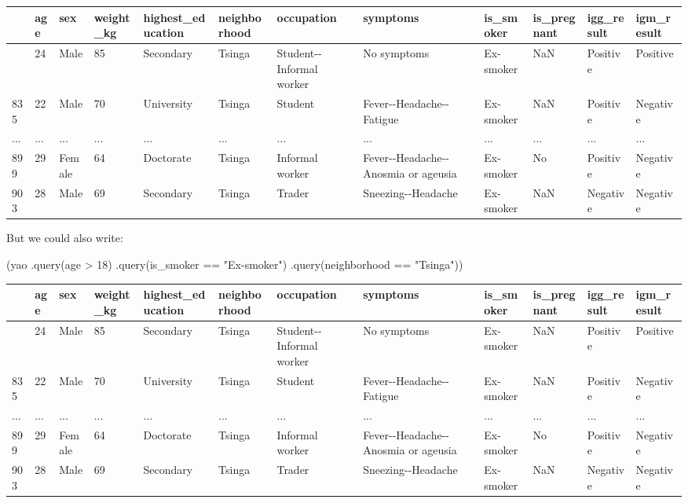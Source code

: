 \documentclass[
  letterpaper,
  DIV=11,
  numbers=noendperiod]{scrreprt}
\newenvironment{Shaded}{\begin{snugshade}}{\end{snugshade}}
\newcommand{\NormalTok}[1]{\textcolor[rgb]{0.00,0.23,0.31}{#1}}
\newcommand{\StringTok}[1]{\textcolor[rgb]{0.13,0.47,0.30}{#1}}
\begin{document}
\begin{longtable}[]{@{}llllllllllll@{}}
\toprule\noalign{}
& age & sex & weight\_kg & highest\_education & neighborhood &
occupation & symptoms & is\_smoker & is\_pregnant & igg\_result &
igm\_result \\
\midrule\noalign{}
\endhead
\bottomrule\noalign{}
\endlastfoot
827 & 24 & Male & 85 & Secondary & Tsinga & Student-\/-Informal worker &
No symptoms & Ex-smoker & NaN & Positive & Positive \\
835 & 22 & Male & 70 & University & Tsinga & Student &
Fever-\/-Headache-\/-Fatigue & Ex-smoker & NaN & Positive & Negative \\
... & ... & ... & ... & ... & ... & ... & ... & ... & ... & ... & ... \\
899 & 29 & Female & 64 & Doctorate & Tsinga & Informal worker &
Fever-\/-Headache-\/-Anosmia or ageusia & Ex-smoker & No & Positive &
Negative \\
903 & 28 & Male & 69 & Secondary & Tsinga & Trader &
Sneezing-\/-Headache & Ex-smoker & NaN & Negative & Negative \\
\end{longtable}

But we could also write:

\begin{Shaded}
\begin{Highlighting}[]
\NormalTok{(yao}
\NormalTok{.query(}\StringTok{\textquotesingle{}age \textgreater{} 18\textquotesingle{}}\NormalTok{)}
\NormalTok{.query(}\StringTok{\textquotesingle{}is\_smoker == "Ex{-}smoker"\textquotesingle{}}\NormalTok{)}
\NormalTok{.query(}\StringTok{\textquotesingle{}neighborhood == "Tsinga"\textquotesingle{}}\NormalTok{))}
\end{Highlighting}
\end{Shaded}

\begin{longtable}[]{@{}llllllllllll@{}}
\toprule\noalign{}
& age & sex & weight\_kg & highest\_education & neighborhood &
occupation & symptoms & is\_smoker & is\_pregnant & igg\_result &
igm\_result \\
\midrule\noalign{}
\endhead
\bottomrule\noalign{}
\endlastfoot
827 & 24 & Male & 85 & Secondary & Tsinga & Student-\/-Informal worker &
No symptoms & Ex-smoker & NaN & Positive & Positive \\
835 & 22 & Male & 70 & University & Tsinga & Student &
Fever-\/-Headache-\/-Fatigue & Ex-smoker & NaN & Positive & Negative \\
... & ... & ... & ... & ... & ... & ... & ... & ... & ... & ... & ... \\
899 & 29 & Female & 64 & Doctorate & Tsinga & Informal worker &
Fever-\/-Headache-\/-Anosmia or ageusia & Ex-smoker & No & Positive &
Negative \\
903 & 28 & Male & 69 & Secondary & Tsinga & Trader &
Sneezing-\/-Headache & Ex-smoker & NaN & Negative & Negative \\
\end{longtable}
\end{document}
